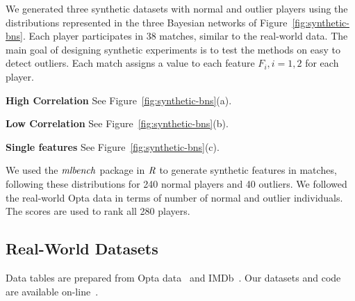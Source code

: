 \documentclass[conference]{IEEEtran}
\begin{document}
				We generated three synthetic datasets with normal and outlier players using the distributions represented in the three Bayesian networks of Figure~\ref{fig:synthetic-bns}. 
				Each player participates in 38 matches, similar to the real-world data. The main goal of designing synthetic experiments is to test the methods on  easy to detect outliers. Each match assigns a value to each feature $F_i, i =  1,2$ for each player. 
				\begin{LaTeXdescription}
				\item\textbf{High Correlation} See Figure~\ref{fig:synthetic-bns}(a).
				\item\textbf{Low Correlation} See Figure~\ref{fig:synthetic-bns}(b).
				\item\textbf{Single features} See Figure~\ref{fig:synthetic-bns}(c).
				\end{LaTeXdescription}
			
				
				
				
				
				
				We used the $\it{mlbench}$ package in $\it{R}$ to generate synthetic features in matches, following these distributions for 240 normal players and 40 outliers. We followed the real-world Opta data in terms of number of normal and outlier individuals. The scores are used to rank all 280 players. 
				\subsection{Real-World Datasets} \label{sec:real-world-data}
				Data tables are prepared from Opta data~\cite{opta-original} and IMDb~\cite{IMDb-original}. Our datasets and code are available on-line~\cite{bib:jbnsite}.
\end{document}
